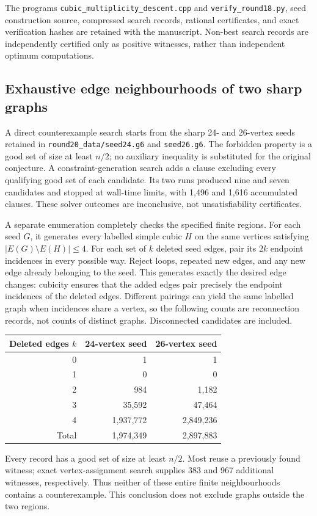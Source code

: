 \documentclass[11pt]{article}
\begin{document}
The programs \texttt{cubic\_multiplicity\_descent.cpp} and
\texttt{verify\_round18.py}, seed construction source, compressed
search records, rational certificates, and exact verification hashes
are retained with the manuscript. Non-best search records are
independently certified only as positive witnesses, rather than
independent optimum computations.

\subsection{Exhaustive edge neighbourhoods of two sharp graphs}
\label{sec:round20}
A direct counterexample search starts from the sharp 24- and 26-vertex
seeds retained in \texttt{round20\_data/seed24.g6} and
\texttt{seed26.g6}. The forbidden property is a good set of size at
least $n/2$; no auxiliary inequality is substituted for the original
conjecture. A constraint-generation search adds a clause excluding
every qualifying good set of each candidate. Its two runs produced
nine and seven candidates and stopped at wall-time limits, with
1,496 and 1,616 accumulated clauses. These solver outcomes are
inconclusive, not unsatisfiability certificates.

A separate enumeration completely checks the specified finite regions.
For each seed $G$, it generates every labelled simple cubic $H$ on
the same vertices satisfying $|E(G)\setminus E(H)|\leq4$.
For each set of $k$ deleted seed edges, pair its $2k$ endpoint
incidences in every possible way. Reject loops, repeated new edges,
and any new edge already belonging to the seed. This generates
exactly the desired edge changes: cubicity ensures that the added
edges pair precisely the endpoint incidences of the deleted edges.
Different pairings can yield the same labelled graph when incidences
share a vertex, so the following counts are reconnection records,
not counts of distinct graphs. Disconnected candidates are included.
\begin{center}
\begin{tabular}{rrr}
\toprule
Deleted edges $k$ & 24-vertex seed & 26-vertex seed\\
\midrule
0 & 1 & 1\\
1 & 0 & 0\\
2 & 984 & 1,182\\
3 & 35,592 & 47,464\\
4 & 1,937,772 & 2,849,236\\
\midrule
Total & 1,974,349 & 2,897,883\\
\bottomrule
\end{tabular}
\end{center}
Every record has a good set of size at least $n/2$. Most reuse a
previously found witness; exact vertex-assignment search supplies
383 and 967 additional witnesses, respectively. Thus neither of
these entire finite neighbourhoods contains a counterexample.
This conclusion does not exclude graphs outside the two regions.
\end{document}
